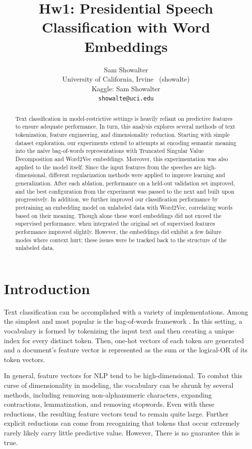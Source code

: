 \documentclass[11pt,a4paper]{article}
\title{Hw1: Presidential Speech Classification with Word Embeddings}
\author{Sam Showalter \\
  University of California, Irvine \ (showalte) \\  
  Kaggle: Sam Showalter \\
\texttt{showalte@uci.edu}}
\date{}
\begin{document}
\maketitle
\begin{abstract}
  Text classification in model-restrictive settings is heavily reliant on predictive features to ensure adequate performance. In turn, this analysis explores several methods of text tokenization, feature engineering, and dimensionality reduction. Starting with simple dataset exploration, our experiments extend to attempts at encoding semantic meaning into the naive bag-of-words representations with Truncated Singular Value Decomposition and Word2Vec embeddings.
  Moreover, this experimentation was also applied to the model itself. Since the input features from the speeches are high-dimensional, different regularization methods were applied to improve learning and generalization. After each ablation, performance on a held-out validation set improved, and the best configuration from the experiment was passed to the next and built upon progressively. 
  In addition, we further improved our classification performance by pretraining an embedding model on unlabeled data with Word2Vec, correlating words based on their meaning. Though alone these word embeddings did not exceed the supervised performance, when integrated the original set of supervised features performance improved slightly. However, the embeddings did exhibit a few failure modes where context hurt; these issues were be tracked back to the structure of the unlabeled data.  
\end{abstract}


\section{Introduction}

Text classification can be accomplished with a variety of implementations. Among the simplest and most popular is the bag-of-words framework \cite{zhang2010understanding}. In this setting, a vocabulary is formed by tokenizing the input text and then creating a unique index for every distinct token. Then, one-hot vectors of each token are generated and a document's feature vector is represented as the sum or the logical-OR of its token vectors.

In general, feature vectors for NLP tend to be high-dimensional. To combat this curse of dimensionality in modeling, the vocabulary can be shrunk by several methods, including removing non-alphanumeric characters, expanding contractions, lemmatization, and removing stopwords. Even with these reductions, the resulting feature vectors tend to remain quite large. Further explicit reductions can come from recognizing that tokens that occur extremely rarely likely carry little predictive value. However, There is no guarantee this is true.
\end{document}
